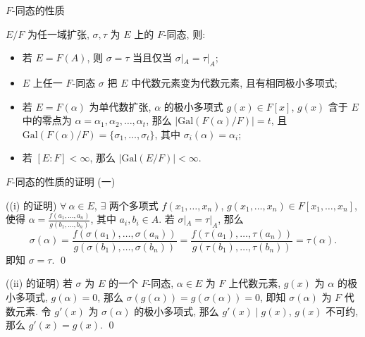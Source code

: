 
\begin{frame}{$F$-同态的性质}

\begin{lem}[$F$-同态的性质]
$E/F$ 为任一域扩张, $\sigma, \tau$ 为 $E$ 上的 $F$-同态, 则:
\begin{itemize}
\item[(i)] 若 $E = F(A)$, 则 $\sigma = \tau$ 当且仅当 $\sigma|_A = \tau|_A$;
\item[(ii)] $E$ 上任一 $F$-同态 $\sigma$ 把 $E$ 中代数元素变为代数元素,
  且有相同极小多项式;
\item[(iii)] 若 $E = F(\alpha)$ 为单代数扩张, $\alpha$ 的极小多项式
  $g(x) \in F[x]$, $g(x)$ 含于 $E$ 中的零点为 $\alpha = \alpha_1, \alpha_2, \dots, \alpha_t$,
  那么 $|\mathrm{Gal}(F(\alpha)/F)| = t$,
  且 $\mathrm{Gal}(F(\alpha)/F) = \{ \sigma_1, \dots, \sigma_t \}$,
  其中 $\sigma_i(\alpha) = \alpha_i$;
\item[(iv)] 若 $[E:F] < \infty$, 那么 $|\mathrm{Gal}(E/F)| < \infty$.
\end{itemize}
\end{lem}

\end{frame}


\begin{frame}{$F$-同态的性质的证明 (一)}

\startproof[bg=yellow, fg=red]((i) 的证明)
$\forall\ \alpha \in E$, $\exists$ 两个多项式
$f(x_1, \dots, x_n)$, $g(x_1, \dots, x_n) \in F[x_1, \dots, x_n]$,
使得 $\alpha = \frac{f(a_1, \dots, a_n)}{g(b_1, \dots, b_n)}$,
其中 $a_i, b_i \in A$.
若 $\sigma|_A = \tau|_A$, 那么
\[
\sigma(\alpha) = \frac{f(\sigma(a_1), \dots, \sigma(a_n))}{g(\sigma(b_1), \dots, \sigma(b_n))}
= \frac{f(\tau(a_1), \dots, \tau(a_n))}{g(\tau(b_1), \dots, \tau(b_n))} = \tau(\alpha).
\]
即知 $\sigma = \tau$.
\qed

\pause

\startproof[bg=yellow, fg=red]((ii) 的证明)
若 $\sigma$ 为 $E$ 的一个 $F$-同态, $\alpha \in E$ 为 $F$ 上代数元素,
$g(x)$ 为 $\alpha$ 的极小多项式, $g(\alpha) = 0$,
那么 $\sigma(g(\alpha)) = g(\sigma(\alpha)) = 0$,
即知 $\sigma(\alpha)$ 为 $F$ 代数元素.
令 $g'(x)$ 为 $\sigma(\alpha)$ 的极小多项式, 那么 $g'(x) \mid g(x)$,
$g(x)$ 不可约, 那么 $g'(x) = g(x)$.
\qed

\end{frame}

